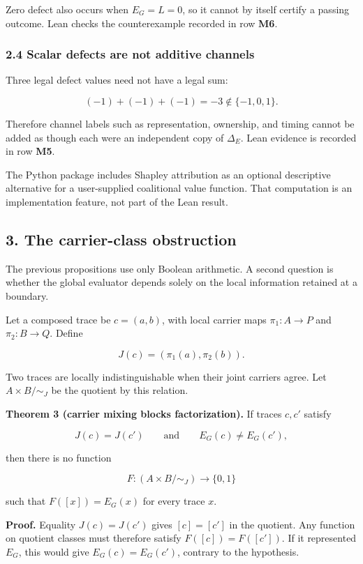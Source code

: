 \documentclass[
  11pt,
]{article}
\theoremstyle{plain}
\theoremstyle{definition}\newtheorem{definition}[theorem]{Definition}
\theoremstyle{remark}\newtheorem*{remark}{Remark}
\begin{document}
Zero defect also occurs when \(E_G=L=0\), so it cannot by itself certify
a passing outcome. Lean checks the counterexample recorded in row
\textbf{M6}.

\subsubsection{2.4 Scalar defects are not additive
channels}\label{scalar-defects-are-not-additive-channels}

Three legal defect values need not have a legal sum:

\[
(-1)+(-1)+(-1)=-3\notin\{-1,0,1\}.
\]

Therefore channel labels such as representation, ownership, and timing
cannot be added as though each were an independent copy of \(\Delta_E\).
Lean evidence is recorded in row \textbf{M5}.

The Python package includes Shapley attribution as an optional
descriptive alternative for a user-supplied coalitional value function.
That computation is an implementation feature, not part of the Lean
result.

\subsection{3. The carrier-class
obstruction}\label{the-carrier-class-obstruction}

The previous propositions use only Boolean arithmetic. A second question
is whether the global evaluator depends solely on the local information
retained at a boundary.

Let a composed trace be \(c=(a,b)\), with local carrier maps
\(\pi_1:A\to P\) and \(\pi_2:B\to Q\). Define

\[
J(c)=(\pi_1(a),\pi_2(b)).
\]

Two traces are locally indistinguishable when their joint carriers
agree. Let \(A\times B/{\sim_J}\) be the quotient by this relation.

\textbf{Theorem 3 (carrier mixing blocks factorization).} If traces
\(c,c'\) satisfy

\[
J(c)=J(c') \qquad\text{and}\qquad E_G(c)\ne E_G(c'),
\]

then there is no function

\[
F:(A\times B/{\sim_J})\to\{0,1\}
\]

such that \(F([x])=E_G(x)\) for every trace \(x\).

\textbf{Proof.} Equality \(J(c)=J(c')\) gives \([c]=[c']\) in the
quotient. Any function on quotient classes must therefore satisfy
\(F([c])=F([c'])\). If it represented \(E_G\), this would give
\(E_G(c)=E_G(c')\), contrary to the hypothesis.
\end{document}
